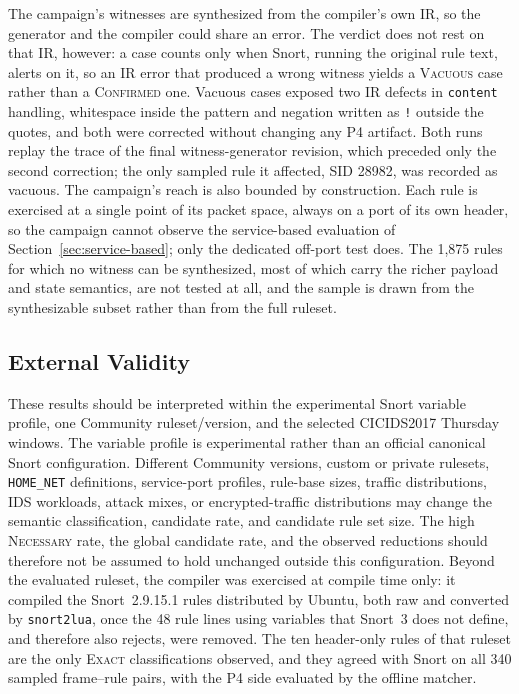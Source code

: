 \documentclass{article}
\begin{document}
The campaign's witnesses are synthesized from the compiler's own IR, so the
generator and the compiler could share an error. The verdict does not rest on
that IR, however: a case counts only when Snort, running the original rule
text, alerts on it, so an IR error that produced a wrong witness yields a
\textsc{Vacuous} case rather than a \textsc{Confirmed} one. Vacuous cases
exposed two IR defects in \texttt{content} handling, whitespace inside the
pattern and negation written as \texttt{!} outside the quotes, and both were
corrected without changing any P4 artifact. Both runs replay the trace of the
final witness-generator revision, which preceded only the second correction;
the only sampled rule it affected, SID 28982, was recorded as vacuous. The
campaign's reach is also bounded by construction. Each rule is exercised at a
single point of its packet space, always on a port of its own header, so the
campaign cannot observe the service-based evaluation of
Section~\ref{sec:service-based}; only the dedicated off-port test does.
The 1,875 rules for which no witness can be synthesized, most of which carry
the richer payload and state semantics, are not tested at all, and the sample
is drawn from the synthesizable subset rather than from the full ruleset.

\subsection{External Validity}
These results should be interpreted within the experimental Snort variable
profile, one Community ruleset/version, and the selected CICIDS2017 Thursday
windows. The variable profile is experimental rather than an official
canonical Snort configuration. Different Community versions, custom or
private rulesets, \texttt{HOME\_NET} definitions, service-port profiles,
rule-base sizes, traffic distributions, IDS workloads, attack mixes, or
encrypted-traffic distributions may change the semantic classification,
candidate rate, and candidate rule set size. The high \textsc{Necessary}
rate, the global candidate rate, and the observed reductions should therefore
not be assumed to hold unchanged outside this configuration.
Beyond the evaluated ruleset, the compiler was exercised at compile time
only: it compiled the Snort~2.9.15.1 rules distributed by Ubuntu, both raw
and converted by \texttt{snort2lua}, once the 48 rule lines using variables
that Snort~3 does not define, and therefore also rejects, were removed. The
ten header-only rules of that ruleset are the only \textsc{Exact}
classifications observed, and they agreed with Snort on all 340 sampled
frame--rule pairs, with the P4 side evaluated by the offline matcher.
\end{document}
